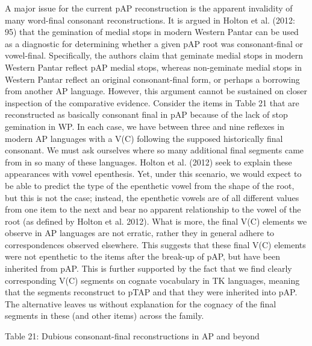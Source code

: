 A major issue for the current pAP reconstruction is the apparent invalidity of many word-final consonant reconstructions. It is argued in Holton et al. (2012: 95) that the gemination of medial stops in modern Western Pantar can be used as a diagnostic for determining whether a given pAP root was consonant-final or vowel-final. Specifically, the authors claim that geminate medial stops in modern Western Pantar reflect pAP medial stops, whereas non-geminate medial stops in Western Pantar reflect an original consonant-final form, or perhaps a borrowing from another AP language. However, this argument cannot be sustained on closer inspection of the comparative evidence. Consider the items in Table 21 that are reconstructed as basically consonant final in pAP because of the lack of stop gemination in WP. In each case, we have between three and nine reflexes in modern AP languages with a V(C) following the supposed historically final consonant. We must ask ourselves where so many additional final segments came 
from in so many of these languages. Holton et al. (2012) seek to explain these appearances with vowel epenthesis. Yet, under this scenario, we would expect to be able to predict the type of the epenthetic vowel from the shape of the root, but this is not the case; instead, the epenthetic vowels are of all different values from one item to the next and bear no apparent relationship to the vowel of the root (as defined by Holton et al. 2012). What is more, the final V(C) elements we observe in AP languages are not erratic, rather they in general adhere to correspondences observed elsewhere. This suggests that these final V(C) elements were not epenthetic to the items after the break-up of pAP, but have been inherited from pAP. This is further supported by the fact that we find clearly corresponding V(C) segments on cognate vocabulary in TK languages, meaning that the segments reconstruct to pTAP and that they were inherited into pAP. The alternative leaves us without explanation for the cognacy of the final 
segments in these (and other items) across the family. 

{\centering
Table 21: Dubious consonant-final reconstructions in AP and beyond
\par}

